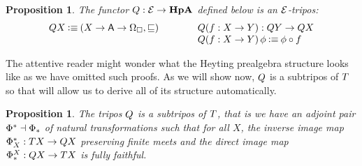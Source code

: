 \documentclass[11pt]{article}
\newtheorem{prop}[thrm]{Proposition}
\begin{document}
\begin{prop}
  The functor \(Q : \mathcal{E} \to \textbf{HpA}\) defined below is an \(\mathcal{E}\)-tripos:
  \[\begin{array}{lll}
    {Q{X}} \mathbin{\vcentcolon\equiv} {({{X}\to{{{\ensuremath{\mathsf{A}}}\to{\Omega_\Box}}}}, \sqsubseteq)}&\qquad&
    {Q{(f:X\to Y)}} : Q{Y} \to Q{X}\\
    &&{Q{(f:X\to Y)}\,\phi} \mathbin{\vcentcolon\equiv} {\phi \circ f}
  \end{array}\]
\end{prop}

The attentive reader might wonder what the Heyting prealgebra structure looks
like as we have omitted such proofs.
%
As we will show now, \(Q\) is a subtripos of \(T\) so that will allow
us to derive all of its structure automatically.

\begin{prop}
  The tripos \(Q\) is a subtripos of \(T\), that is we have an adjoint
  pair \(\Phi^\ast \dashv \Phi_\ast\) of natural transformations such that for all
  \(X\), the inverse image map \(\Phi^\ast_{X} : T{X} \to Q{X}\) preserving
  finite meets and the direct image map \(\Phi_\ast^{X} : Q{X} \to T{X}\) is
  fully faithful.
\end{prop}
\end{document}
